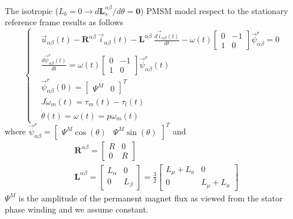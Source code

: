 \documentclass[12pt,a4paper,oneside]{book}
\begin{document}
\begin{onehalfspace}
\begin{mybox}
	The isotropic ($L_b=0 \rightarrow 
	d\mathbf{L}_s^{\alpha\beta}/d\theta=\mathbf{0}$) PMSM model respect to the 
	stationary reference frame results as follows
	\begin{equation}\label{twophase_eq1tris}
		\left\lbrace \begin{aligned}
			& \vec{u}_{\alpha\beta}(t)-\mathbf{R}^{\alpha\beta}\ 
			\vec{i}_{\alpha\beta}(t)-\mathbf{L}^{\alpha\beta}\ 
			\frac{d\vec{i}_{\alpha\beta}(t)}{dt}-\omega(t) \begin{bmatrix} 0 & 
				-1 \\ 1 & 0\end{bmatrix} \vec{\psi}^r_{\alpha\beta} = 0 \\[6pt]
			& \frac{d\vec{\psi}^r_{\alpha\beta}(t)}{dt} = \omega(t) 
			\begin{bmatrix} 0 & -1 \\ 1 & 0\end{bmatrix} 
			\vec{\psi}^r_{\alpha\beta}(t) \\[6pt]
			& \vec{\psi}^r_{\alpha\beta}(0) = \begin{bmatrix} \Psi^M &  0 
			\end{bmatrix}^T \\[6pt]
			& J\dot{\omega}_m(t) = \tau_m(t)-\tau_l(t) \\[6pt]
			& \dot{\theta}(t) = \omega(t) = p\omega_m(t)
		\end{aligned} \right. 
	\end{equation}
	where $\vec{\psi}^r_{\alpha\beta} = \begin{bmatrix} \Psi^M\cos(\theta) &  
		\Psi^M\sin(\theta)\end{bmatrix}^T$ and
	\begin{equation*}
		\begin{aligned}
			& \mathbf{R}^{\alpha\beta} = 
			\begin{bmatrix} R &  0 \\
				0 & R
			\end{bmatrix} \\[6pt]
			& \mathbf{L}^{\alpha\beta} = 
			\begin{bmatrix} L_{\alpha} &  0 \\
				0 & L_{\beta}
			\end{bmatrix} = \frac{3}{2}
			\begin{bmatrix} L_\mu+L_a &  0 \\
				0 & L_\mu+L_a
			\end{bmatrix}
		\end{aligned} 
	\end{equation*}
	$\Psi^M$ is the amplitude of the permanent magnet flux as viewed from the 
	stator phase winding and we assume constant.
\end{mybox}


\end{onehalfspace}
\end{document}
